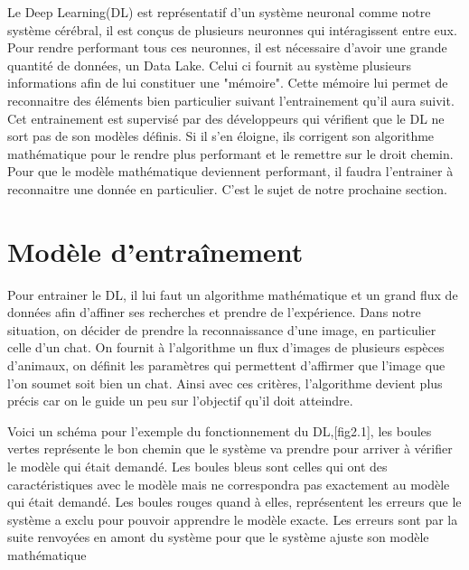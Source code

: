\documentclass[12pt,a4paper]{report}
\begin{document}
Le Deep Learning(DL) est représentatif d'un système neuronal comme notre système cérébral, il est conçus de plusieurs neuronnes qui intéragissent entre eux. Pour rendre performant tous ces neuronnes, il est nécessaire d'avoir une grande quantité de données, un Data Lake. Celui ci fournit au système plusieurs informations afin de lui constituer une "mémoire". Cette mémoire lui permet de reconnaitre des éléments bien particulier suivant l'entrainement qu'il aura suivit. Cet entrainement est supervisé par des développeurs qui vérifient que le DL ne sort pas de son modèles définis.
Si il s'en éloigne, ils corrigent son algorithme mathématique pour le rendre plus performant et le remettre sur le droit chemin. Pour que le modèle mathématique deviennent performant, il faudra l'entrainer à reconnaitre une donnée en particulier. C'est le sujet de notre prochaine section.


\section{Modèle d'entraînement}

Pour entrainer le DL, il lui faut un algorithme mathématique et un grand flux de données afin d'affiner ses recherches et prendre de l'expérience. Dans notre situation, on décider de prendre la reconnaissance d'une image, en particulier celle d'un chat.
On fournit à l'algorithme un flux d'images de plusieurs espèces d'animaux, on définit les paramètres qui permettent d'affirmer que l'image que l'on soumet soit bien un chat. Ainsi avec ces critères, l'algorithme devient plus précis car on le guide un peu sur l'objectif qu'il doit atteindre.
 
Voici un schéma pour l'exemple du fonctionnement du DL,[fig2.1], les boules vertes représente le bon chemin que le système va prendre pour arriver à vérifier le modèle qui était demandé. Les boules bleus sont celles qui ont des caractéristiques avec le modèle mais ne correspondra pas exactement au modèle qui était demandé. Les boules rouges quand à elles, représentent les erreurs que le système a exclu pour pouvoir apprendre le modèle exacte. Les erreurs sont par la suite renvoyées en amont du système pour que le système ajuste son modèle mathématique
\end{document}
